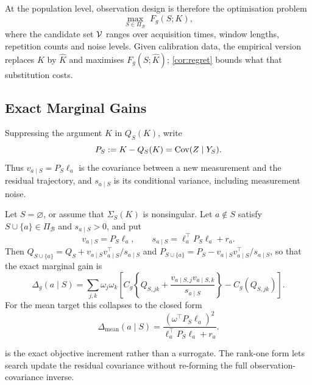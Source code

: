 At the population level, observation design is therefore the optimisation problem
\begin{equation}
\max_{S\in\Pi_{\mathcal B}}\;F_g(S;K),
\label{eq:design-problem}
\end{equation}
where the candidate set $\mathcal{V}$ ranges over acquisition times, window lengths,
repetition counts and noise levels. Given calibration data, the empirical
version replaces $K$ by $\widehat K$ and maximises $F_g(S;\widehat K)$;
\cref{cor:regret} bounds what that substitution costs.

\subsection{Exact Marginal Gains}

Suppressing the argument $K$ in $Q_S(K)$, write
\begin{equation}
P_S:=K-Q_S(K)=\operatorname{Cov}(Z\mid Y_S).
\label{eq:residual-covariance}
\end{equation}
Thus $v_{a\mid S}=P_S\ell_a$ is the covariance between a new measurement and
the residual trajectory, and $s_{a\mid S}$ is its conditional variance,
including measurement noise.

\begin{proposition}
\label{prop:marginal}
Let $S=\varnothing$, or assume that $\Sigma_S(K)$ is nonsingular. Let
$a\notin S$ satisfy
$S\cup\{a\}\in\Pi_{\mathcal B}$ and $s_{a\mid S}>0$, and put
\begin{equation}
v_{a\mid S}=P_S\ell_a,
\qquad
s_{a\mid S}=\ell_a^\top P_S\ell_a+r_a.
\label{eq:vs}
\end{equation}
Then $Q_{S\cup\{a\}}=Q_S+v_{a\mid S}v_{a\mid S}^\top/s_{a\mid S}$ and
$P_{S\cup\{a\}}=P_S-v_{a\mid S}v_{a\mid S}^\top/s_{a\mid S}$, so that the exact
marginal gain is
\begin{equation}
\Delta_g(a\mid S)
=\sum_{j,k}\omega_j\omega_k
\left[C_g\!\left\{Q_{S,jk}+\frac{v_{a\mid S,j}v_{a\mid S,k}}{s_{a\mid S}}\right\}
-C_g(Q_{S,jk})\right].
\label{eq:marginal-nonlinear}
\end{equation}
For the mean target this collapses to the closed form
\begin{equation}
\Delta_{\mathrm{mean}}(a\mid S)
=\frac{(\omega^\top P_S\ell_a)^2}{\ell_a^\top P_S\ell_a+r_a}.
\label{eq:marginal-mean}
\end{equation}
\end{proposition}

 is the exact objective increment rather than a
surrogate. The rank-one form lets search update the residual covariance without
re-forming the full observation-covariance inverse.

